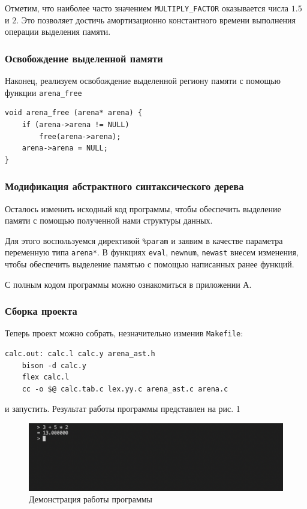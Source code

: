 \documentclass[bachelor, och, otchet]{SCWorks}
\begin{document}
Отметим, что наиболее часто значением \verb|MULTIPLY_FACTOR| оказывается числа
$1.5$ и $2$. Это позволяет достичь амортизационно константного времени
выполнения операции выделения памяти\cite{FacebookDoc}.

\subsubsection{Освобождение выделенной памяти}
Наконец, реализуем освобождение выделенной региону памяти с помощью функции
\verb|arena_free|

\begin{verbatim}
void arena_free (arena* arena) { 
    if (arena->arena != NULL) 
        free(arena->arena);
    arena->arena = NULL; 
}
\end{verbatim}

\subsubsection{Модификация абстрактного синтаксического дерева}
Осталось изменить исходный код программы, чтобы обеспечить выделение памяти с
помощью полученной нами структуры данных.

Для этого воспользуемся директивой \verb|%param| и заявим в качестве параметра
переменную типа \verb|arena*|. В функциях \verb|eval|, \verb|newnum|,
\verb|newast| внесем изменения, чтобы обеспечить выделение памятью с помощью
написанных ранее функций.

С полным кодом программы можно ознакомиться в приложении А.

\subsubsection{Сборка проекта}
Теперь проект можно собрать, незначительно изменив \verb|Makefile|:

\begin{verbatim}
calc.out: calc.l calc.y arena_ast.h 
    bison -d calc.y 
    flex calc.l 
    cc -o $@ calc.tab.c lex.yy.c arena_ast.c arena.c
\end{verbatim}
и запустить. Результат работы программы представлен на рис. 1

\begin{figure}[hbt!]
    \centering
    \includegraphics[scale=0.5]{naivetest.png}
    \caption{Демонстрация работы программы}
    \label{fig:naivetest}
\end{figure}
\end{document}
